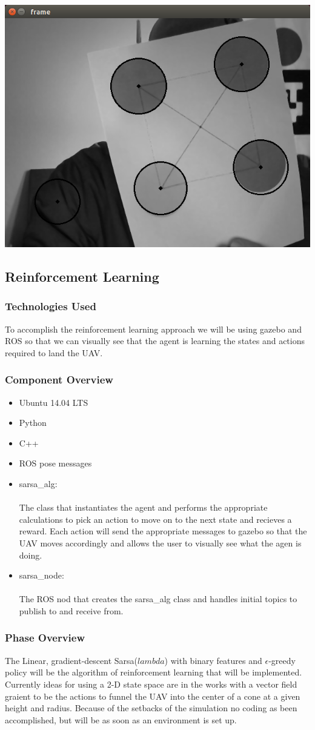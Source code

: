 \begin{center} \includegraphics[width=.5\textwidth]{circles.png} \end{center}

\subsection{Reinforcement Learning}
\subsubsection{Technologies  Used}
To accomplish the reinforcement learning approach we will be using gazebo and ROS so that we can visually see that the agent is learning the states and actions required to land the UAV.  
\subsubsection{Component  Overview}
\begin{itemize}
  \item Ubuntu 14.04 LTS
  \item Python
  \item C++
  \item ROS pose messages
  \item sarsa\_alg: \\
  \\
  The class that instantiates the agent and performs the appropriate calculations to pick an action to move on to the next state and recieves a reward. Each action will send the appropriate messages to gazebo so that the UAV moves accordingly and allows the user to visually see what the agen is doing.
  \item sarsa\_node: \\
  \\
  The ROS nod that creates the sarsa\_alg class and handles initial topics to publish to and receive from.
\end{itemize}
\subsubsection{Phase Overview}
The Linear, gradient-descent Sarsa($lambda$) with binary features and $\epsilon$-greedy policy will be the algorithm of reinforcement learning that will be implemented. Currently ideas for using a 2-D state space are in the works with a vector field graient to be the actions to funnel the UAV into the center of a cone at a given height and radius. Because of the setbacks of the simulation no coding as been accomplished, but will be as soon as an environment is set up.
\newpage
